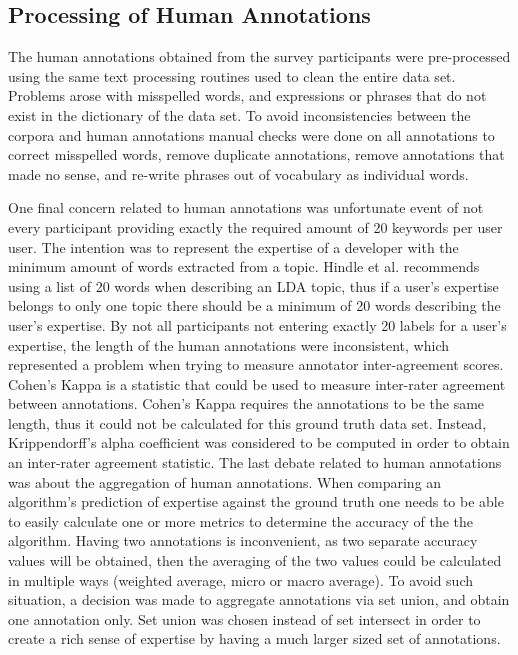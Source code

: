         \subsection{Processing of Human Annotations}
        
            The human annotations obtained from the survey participants were pre-processed using the same text processing routines used to clean the entire data set. Problems arose with misspelled words, and expressions or phrases that do not exist in the dictionary of the data set. To avoid inconsistencies between the corpora and human annotations manual checks were done on all annotations to correct misspelled words, remove duplicate annotations, remove annotations that made no sense, and re-write phrases out of vocabulary as individual words. 
            
            One final concern related to human annotations was unfortunate event of not every participant providing exactly the required amount of 20 keywords per user user. The intention was to represent the expertise of a developer with the minimum amount of words extracted from a topic. Hindle et al. \cite{hindle2012relating} recommends using a list of 20 words when describing an LDA topic, thus if a user's expertise belongs to only one topic there should be a minimum of 20 words describing the user's expertise. By not all participants not entering exactly 20 labels for a user's expertise, the length of the human annotations were inconsistent, which represented a problem when trying to measure annotator inter-agreement scores. Cohen's Kappa is a statistic that could be used to measure inter-rater agreement between annotations. Cohen's Kappa requires the annotations to be the same length, thus it could not be calculated for this ground truth data set. Instead, Krippendorff's alpha coefficient was considered to be computed in order to obtain an inter-rater agreement statistic. The last debate related to human annotations was about the aggregation of human annotations. When comparing an algorithm's prediction of expertise against the ground truth one needs to be able to easily calculate one or more metrics to determine the accuracy of the the algorithm. Having two annotations is inconvenient, as two separate accuracy values will be obtained, then the averaging of the two values could be calculated in multiple ways (weighted average, micro or macro average). To avoid such situation, a decision was made to aggregate annotations via set union, and obtain one annotation only. Set union was chosen instead of set intersect in order to create a rich sense of expertise by having a much larger sized set of annotations.
        
